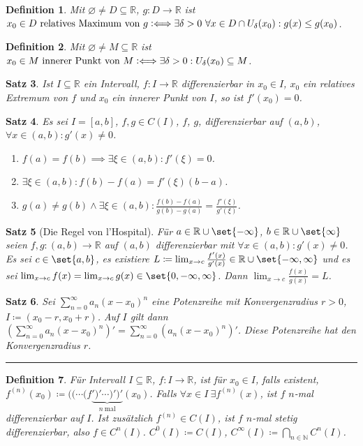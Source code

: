 \documentclass[a4paper]{article}
\newcounter{Sec}
\theoremstyle{marginbreak}
\newtheorem{definition}{Definition}[Sec]
\newtheorem{satz}[definition]{Satz}
\newcommand{\sep}{%
	\rule{\textwidth}{0.3pt}%
	\stepcounter{Sec}%
	}
\newcommand{\defiff}{\mathrel{\vcentcolon\Longleftrightarrow}}
\newcommand{\series}[1][1]{\sum_{n=#1}^\infty}
\newcommand{\ps}[1][a]{\series[0]#1_n(x-x_0)^n}
\begin{document}
	\begin{definition}
		Mit $\varnothing\neq D\subseteq\mathbb{R}$, $g\colon D\to\mathbb{R}$
		ist $x_0\in D~\text{relatives Maximum von $g$}\defiff\exists\delta>0~\forall
		x\in D\cap U_\delta(x_0):g(x)\leq g(x_0)$.
	\end{definition}
	\begin{definition}
		Mit $\varnothing\neq M\subseteq\mathbb{R}$ ist
		$x_0\in M~\text{innerer Punkt von $M$}\defiff\exists\delta>0:U_\delta(x_0)\subseteq M$.
	\end{definition}
	\begin{satz}
		Ist $I\subseteq\mathbb{R}$ ein Intervall, $f\colon I\to\mathbb{R}$ differenzierbar
		in $x_0\in I$, $x_0$ ein relatives Extremum von $f$ und $x_0$ ein innerer
		Punkt von $I$, so ist $f'(x_0)=0$.
	\end{satz}
	\begin{satz}
		Es sei $I=[a,b]$, $f, g\in C(I)$, $f$, $g$, differenzierbar auf $(a,b)$,
		$\forall x\in(a,b): g'(x)\neq0$.
		\begin{enumerate}[label=(\alph*)]
			\item $f(a)=f(b)\implies\exists\xi\in(a,b):f'(\xi)=0$.
			\item $\exists\xi\in(a,b):f(b)-f(a)=f'(\xi)(b-a)$.
			\item $g(a)\neq g(b)\wedge\exists\xi\in(a,b):\frac{f(b)-f(a)}{g(b)-g(a)}=\frac{f'(\xi)}{g'(\xi)}$.
		\end{enumerate}
	\end{satz}
	\begin{satz}[Die Regel von l'Hospital]
		Für $a\in\mathbb{R}\cup\set{-\infty}$, $b\in\mathbb{R}\cup\set{\infty}$
		seien $f,g\colon (a,b)\to\mathbb{R}$ auf $(a,b)$ differenzierbar mit
		$\forall x\in(a,b):g'(x)\neq0$. Es sei $c\in\set{a, b}$, es existiere
		$L\coloneqq\lim_{x\to c}\frac{f'(x)}{g'(x)}\in\mathbb{R}\cup\set{-\infty, \infty}$
		und es sei $\lim_{x\to c}f(x)=\lim_{x\to c}g(x)\in\set{0,-\infty,\infty}$.
		Dann $\lim_{x\to c}\frac{f(x)}{g(x)}=L$.
	\end{satz}
	\begin{satz}
		Sei $\ps$ eine Potenzreihe mit Konvergenzradius $r>0$, $I\coloneqq(x_0-r,x_0+r)$.
		Auf $I$ gilt dann $(\ps)'=\sum_{n=0}^\infty(a_n(x-x_0)^n)'$. Diese Potenzreihe
		hat den Konvergenzradius $r$.
	\end{satz}
	\sep
	\begin{definition}
		Für Intervall $I\subseteq\mathbb{R}$, $f\colon I\to\mathbb{R}$, ist für $x_0\in I$,
		falls existent, $f^{(n)}(x_0) \coloneqq ((\cdots(f\underbrace{')'\cdots)')'}_{n~\text{mal}}(x_0)$.
		Falls $\forall x\in I~\exists f^{(n)}(x)$, ist $f$ $n$-mal differenzierbar auf $I$.
		Ist zusätzlich $f^{(n)}\in C(I)$, ist $f$ $n$-mal stetig differenzierbar, also
		$f\in C^n(I)$. $C^0(I)\coloneqq C(I)$, $C^\infty(I)\coloneqq\bigcap_{n\in\mathbb{N}}C^n(I)$.
	\end{definition}
\end{document}
